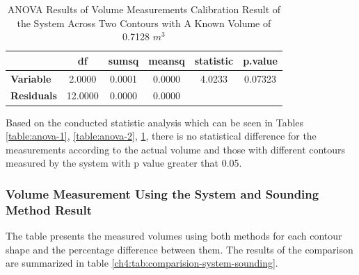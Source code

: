 \begin{enumerate}
	      \begin{table}[H]
		      \centering
		      \caption{ANOVA Results of Volume Measurements Calibration Result of the System Across Two Contours with A Known Volume of 0.7128 $m^3$}
		      \label{table:anova-3}
		      \begin{tabular}{@{}lccccc@{}}
			      \toprule
			                         & \textbf{df} & \textbf{sumsq} & \textbf{meansq} & \textbf{statistic} & \textbf{p.value} \\ \midrule
			      \textbf{Variable}  & 2.0000      & 0.0001         & 0.0000          & 4.0233             & 0.07323          \\
			      \textbf{Residuals} & 12.0000     & 0.0000         & 0.0000          &                    &                  \\ \bottomrule
		      \end{tabular}%
	      \end{table}

	      Based on the conducted statistic analysis which can be seen in Tables \ref{table:anova-1}, \ref{table:anova-2}, \ref{table:anova-3}, there is no statistical difference for the measurements according to the actual volume and those with different contours measured by the system with p value greater that 0.05.
\end{enumerate}

\subsubsection{Volume Measurement Using the System and Sounding Method Result}
The table presents the measured volumes using both methods for each contour shape and the percentage difference between them. The results of the comparison are summarized in table \ref{ch4:tab:comparision-system-sounding}. \\

